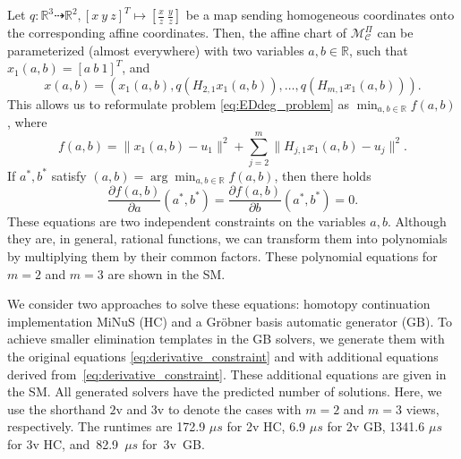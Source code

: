 \documentclass{article}
\newcommand{\RR}{\mathbb{R}}
\begin{document}
Let $q: \RR^3 \dashrightarrow \RR^2, [x \ y \ z ]^T \longmapsto [\frac{x}{z} \ \frac{y}{z}]$ be a map sending homogeneous coordinates onto the corresponding affine coordinates.
Then, the affine chart of $\mathcal{M}_\mathcal{C}^\Pi$ can be parameterized (almost everywhere) with two variables $a,b \in \RR$, such that $x_1(a,b) = [a \ b \ 1]^T$, and
\begin{equation}
    x(a,b) = (x_1(a,b), q(H_{2,1}x_1(a,b)),\ldots,q(H_{m,1}x_1(a,b))).
\end{equation}
%
This allows us to reformulate problem \eqref{eq:EDdeg_problem} as $\min_{a,b \in \RR} f(a,b)$, where
\begin{equation}
    f(a,b) = \|x_1(a,b) - u_1\|^2 + \sum_{j=2}^m \|H_{j,1}x_1(a,b) - u_j\|^2. 
\end{equation}
%
If $a^*,b^*$ satisfy $(a,b) = \arg\min_{a,b \in \RR} f(a,b)$, then there holds
\begin{equation} \label{eq:derivative_constraint}
    \frac{\partial f(a,b)}{\partial a}(a^*,b^*) = \frac{\partial f(a,b)}{\partial b}(a^*,b^*) = 0.
\end{equation}
%
These equations are two independent constraints on the variables $a,b$. Although they are, in general, rational functions, we can transform them into polynomials by multiplying them by their common factors. These polynomial equations for~$m=2$ and $m=3$ are shown in the SM.

We consider two approaches to solve these equations: homotopy continuation implementation MiNuS \cite{fabbri2020minus} (HC) and a Gr\"obner basis automatic generator \cite{DBLP:conf/cvpr/LarssonAO17} (GB). To achieve smaller elimination templates in the GB solvers, we generate them with the original equations \eqref{eq:derivative_constraint} and with additional equations derived from~\eqref{eq:derivative_constraint}. These additional equations are given in the SM. All generated solvers have the predicted number of solutions.
Here, we use the shorthand $2$v and $3$v to denote the cases with $m=2$ and $m=3$ views, respectively.
The runtimes are 172.9 $\mu s$ for 2v HC, 6.9 $\mu s$ for 2v GB, 1341.6 $\mu s$ for 3v HC, and~\mbox{82.9 $\mu s$} for~3v~GB.
\end{document}
